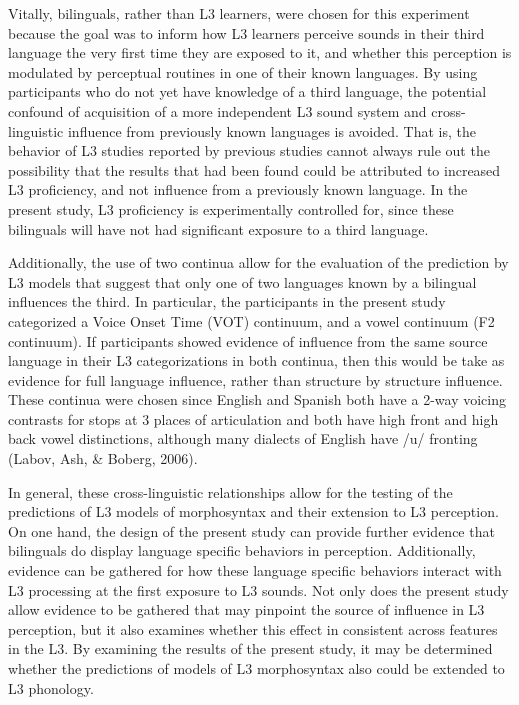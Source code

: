 \documentclass[
  man]{apa6}
\begin{document}
Vitally, bilinguals, rather than L3 learners, were chosen for this experiment because the goal was to inform how L3 learners perceive sounds in their third language the very first time they are exposed to it, and whether this perception is modulated by perceptual routines in one of their known languages.
By using participants who do not yet have knowledge of a third language, the potential confound of acquisition of a more independent L3 sound system and cross-linguistic influence from previously known languages is avoided.
That is, the behavior of L3 studies reported by previous studies cannot always rule out the possibility that the results that had been found could be attributed to increased L3 proficiency, and not influence from a previously known language.
In the present study, L3 proficiency is experimentally controlled for, since these bilinguals will have not had significant exposure to a third language.

Additionally, the use of two continua allow for the evaluation of the prediction by L3 models that suggest that only one of two languages known by a bilingual influences the third. In particular, the participants in the present study categorized a Voice Onset Time (VOT) continuum, and a vowel continuum (F2 continuum). If participants showed evidence of influence from the same source language in their L3 categorizations in both continua, then this would be take as evidence for full language influence, rather than structure by structure influence. These continua were chosen since English and Spanish both have a 2-way voicing contrasts for stops at 3 places of articulation and both have high front and high back vowel distinctions, although many dialects of English have /u/ fronting
(Labov, Ash, \& Boberg, 2006).

In general, these cross-linguistic relationships allow for the testing of the predictions of L3 models of morphosyntax and their extension to L3 perception. On one hand, the design of the present study can provide further evidence that bilinguals do display language specific behaviors in perception. Additionally, evidence can be gathered for how these language specific behaviors interact with L3 processing at the first exposure to L3 sounds.
Not only does the present study allow evidence to be gathered that may pinpoint the source of influence in L3 perception, but it also examines whether this effect in consistent across features in the L3.
By examining the results of the present study, it may be determined whether the predictions of models of L3 morphosyntax also could be extended to L3 phonology.
\end{document}
